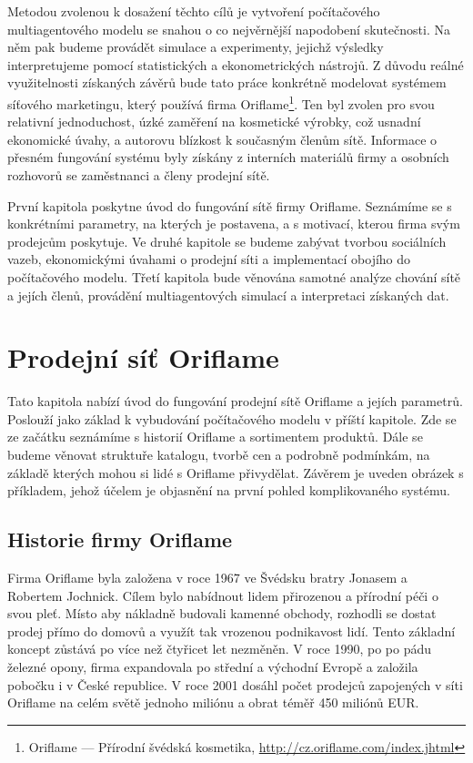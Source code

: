 \documentclass[a4wide,12pt]{report}
\begin{document}
Metodou zvolenou k dosažení těchto cílů je vytvoření počítačového multiagentového modelu se snahou o co nejvěrnější napodobení skutečnosti. Na něm pak budeme provádět simulace a experimenty, jejichž výsledky interpretujeme pomocí statistických a ekonometrických nástrojů. Z důvodu reálné využitelnosti získaných závěrů bude tato práce konkrétně modelovat systémem síťového marketingu, který používá firma Oriflame\footnote{Oriflame --- Přírodní švédská kosmetika, \url{http://cz.oriflame.com/index.jhtml}}. Ten byl zvolen pro svou relativní jednoduchost, úzké zaměření na kosmetické výrobky, což usnadní ekonomické úvahy, a autorovu blízkost k současným členům sítě. Informace o přesném fungování systému byly získány z interních materiálů firmy a osobních rozhovorů se zaměstnanci a členy prodejní sítě.

První kapitola poskytne úvod do fungování sítě firmy Oriflame. Seznámíme se s konkrétními parametry, na kterých je postavena, a s motivací, kterou firma svým prodejcům poskytuje. Ve druhé kapitole se budeme zabývat tvorbou sociálních vazeb, ekonomickými úvahami o prodejní síti a implementací obojího do počítačového modelu. Třetí kapitola bude věnována samotné analýze chování sítě a jejích členů, provádění multiagentových simulací a interpretaci získaných dat.
\chapter{Prodejní síť Oriflame}
Tato kapitola nabízí úvod do fungování prodejní sítě Oriflame a jejích parametrů. Poslouží jako základ k vybudování počítačového modelu v příští kapitole. Zde se ze začátku seznámíme s historií Oriflame a sortimentem produktů. Dále se budeme věnovat struktuře katalogu, tvorbě cen a podrobně podmínkám, na základě kterých mohou si lidé s Oriflame přivydělat. Závěrem je uveden obrázek s příkladem, jehož účelem je objasnění na první pohled komplikovaného systému.
\section{Historie firmy Oriflame}
Firma Oriflame byla založena v roce 1967 ve Švédsku bratry Jonasem a Robertem Jochnick. Cílem bylo nabídnout lidem přirozenou a přírodní péči o svou pleť. Místo aby nákladně budovali kamenné obchody, rozhodli se dostat prodej přímo do domovů a využít tak vrozenou podnikavost lidí. Tento základní koncept zůstává po více než čtyřicet let nezměněn. V roce 1990, po po pádu železné opony, firma expandovala po střední a východní Evropě a založila pobočku i v České republice. V roce 2001 dosáhl počet prodejců zapojených v síti Oriflame na celém světě jednoho miliónu a obrat téměř 450 miliónů EUR.
\end{document}

